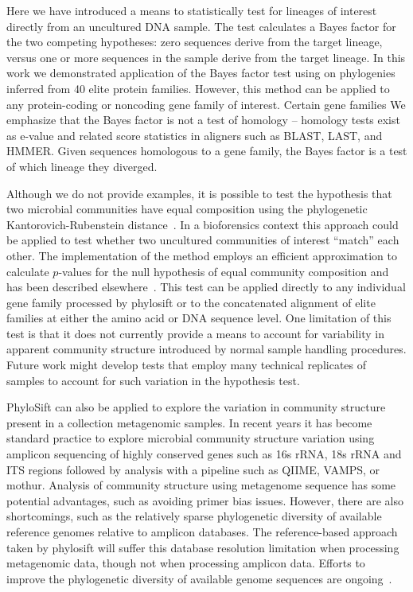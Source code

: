 \documentclass[10pt]{article}
\begin{document}
Here we have introduced a means to statistically test for lineages of interest directly from an uncultured DNA sample.
The test calculates a Bayes factor for the two competing hypotheses: zero sequences derive from the target lineage, versus one or more sequences in the sample derive from the target lineage.
In this work we demonstrated application of the Bayes factor test using on phylogenies inferred from 40 elite protein families.
However, this method can be applied to any protein-coding or noncoding gene family of interest.
Certain gene families
We emphasize that the Bayes factor is not a test of homology -- homology tests exist as e-value and related score statistics in aligners such as BLAST, LAST, and HMMER.
Given sequences homologous to a gene family, the Bayes factor is a test of which lineage they diverged.

Although we do not provide examples, it is possible to test the hypothesis that two microbial communities have equal composition using the phylogenetic Kantorovich-Rubenstein distance~\cite{Evans2010}.
In a bioforensics context this approach could be applied to test whether two uncultured communities of interest ``match'' each other.
The implementation of the method employs an efficient approximation to calculate $p$-values for the null hypothesis of equal community composition and has been described elsewhere~\cite{Evans2010}.
This test can be applied directly to any individual gene family processed by phylosift or to the concatenated alignment of elite families at either the amino acid or DNA sequence level.
One limitation of this test is that it does not currently provide a means to account for variability in apparent community structure introduced by normal sample handling procedures.
Future work might develop tests that employ many technical replicates of samples to account for such variation in the hypothesis test.

PhyloSift can also be applied to explore the variation in community structure present in a collection metagenomic samples.
In recent years it has become standard practice to explore microbial community structure variation using amplicon sequencing of highly conserved genes such as 16s rRNA, 18s rRNA and ITS regions followed by analysis with a pipeline such as QIIME, VAMPS, or mothur.
Analysis of community structure using metagenome sequence has some potential advantages, such as avoiding primer bias issues.
However, there are also shortcomings, such as the relatively sparse phylogenetic diversity of available reference genomes relative to amplicon databases.
The reference-based approach taken by phylosift will suffer this database resolution limitation when processing metagenomic data, though not when processing amplicon data.
Efforts to improve the phylogenetic diversity of available genome sequences are ongoing~\cite{Wu2009}.
\end{document}
